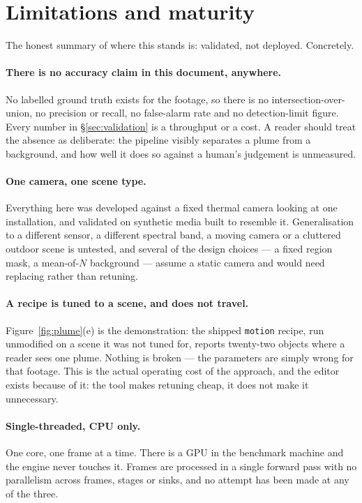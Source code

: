 \section{Limitations and maturity}
\label{sec:limitations}

The honest summary of where this stands is: validated, not deployed. Concretely.

\paragraph{There is no accuracy claim in this document, anywhere.} No labelled
ground truth exists for the footage, so there is no intersection-over-union, no
precision or recall, no false-alarm rate and no detection-limit figure. Every
number in §\ref{sec:validation} is a throughput or a cost. A reader should treat
the absence as deliberate: the pipeline visibly separates a plume from a
background, and how well it does so against a human's judgement is unmeasured.

\paragraph{One camera, one scene type.} Everything here was developed against a
fixed thermal camera looking at one installation, and validated on synthetic
media built to resemble it. Generalisation to a different sensor, a different
spectral band, a moving camera or a cluttered outdoor scene is untested, and
several of the design choices --- a fixed region mask, a mean-of-$N$ background
--- assume a static camera and would need replacing rather than retuning.

\paragraph{A recipe is tuned to a scene, and does not travel.}
Figure~\ref{fig:plume}(e) is the demonstration: the shipped \texttt{motion}
recipe, run unmodified on a scene it was not tuned for, reports twenty-two
objects where a reader sees one plume. Nothing is broken --- the parameters are
simply wrong for that footage. This is the actual operating cost of the approach,
and the editor exists because of it: the tool makes retuning cheap, it does not
make it unnecessary.

\paragraph{Single-threaded, CPU only.} One core, one frame at a time. There is a
GPU in the benchmark machine and the engine never touches it. Frames are
processed in a single forward pass with no parallelism across frames, stages or
sinks, and no attempt has been made at any of the three.

